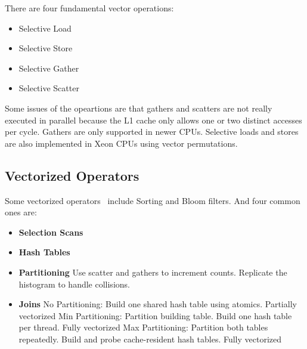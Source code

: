 \documentclass[11pt]{article}
\begin{document}
There are four fundamental vector operations:
\begin{itemize}
	\item Selective Load
	\item Selective Store
	\item Selective Gather
	\item Selective Scatter
\end{itemize}

Some issues of the opeartions are that 
gathers and scatters are not really executed in parallel because the L1 cache only allows one or two distinct accesses per cycle.
Gathers are only supported in newer CPUs.
Selective loads and stores are also implemented in Xeon CPUs using vector permutations.

\subsection*{Vectorized Operators}
Some vectorized operators~\cite{Polychroniou2015} include Sorting and Bloom filters. And four common ones are:
\begin{itemize}
	\item 
	\textbf{Selection Scans}
	
	\item 
	\textbf{Hash Tables}
	
	\item 
	\textbf{Partitioning}
	Use scatter and gathers to increment counts.
	Replicate the histogram to handle collisions.
	
	\item 
	\textbf{Joins}
	No Partitioning: Build one shared hash table using atomics. Partially vectorized
	Min Partitioning: Partition building table. Build one hash table per thread. Fully vectorized
	Max Partitioning: Partition both tables repeatedly. Build and probe cache-resident hash tables. Fully vectorized
\end{itemize}

\newpage


\end{document}
